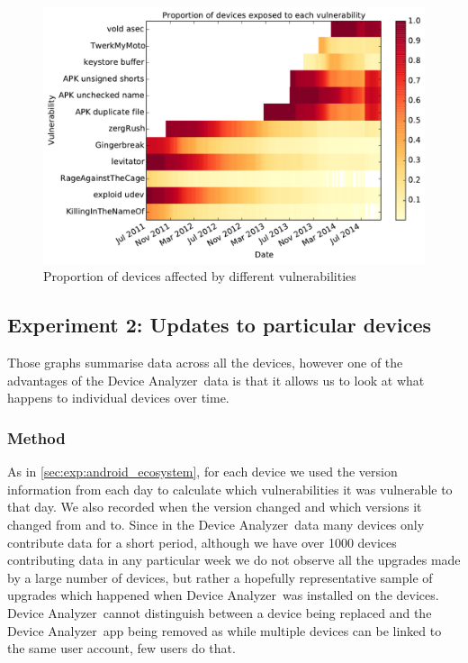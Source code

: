 \documentclass[conference,a4paper,twoside]{IEEEtran}
\newcommand{\da}{Device Analyzer}
\begin{document}
\begin{figure}
 \includegraphics[width=\columnwidth]{figures/nvulnerabilities_heat.pdf}
 \caption{Proportion of devices affected by different vulnerabilities}
 \label{fig:nvulnerabilities_heat}
\end{figure}


\subsection{Experiment 2: Updates to particular devices}\label{sec:exp:device_updates}
Those graphs summarise data across all the devices, however one of the advantages of the \da\ data is that it allows us to look at what happens to individual devices over time.

\subsubsection{Method}
As in \ref{sec:exp:android_ecosystem}, for each device we used the version information from each day to calculate which vulnerabilities it was vulnerable to that day.
We also recorded when the version changed and which versions it changed from and to.
Since in the \da\ data many devices only contribute data for a short period, although we have over 1000 devices contributing data in any particular week we do not observe all the upgrades made by a large number of devices, but rather a hopefully representative sample of upgrades which happened when \da\ was installed on the devices.
\da\ cannot distinguish between a device being replaced and the \da\ app being removed as while multiple devices can be linked to the same user account, few users do that.
\end{document}
